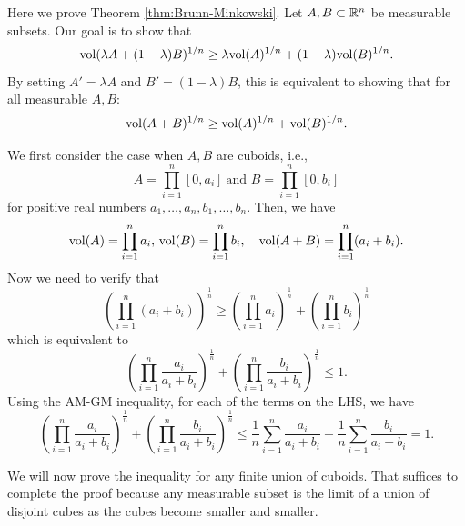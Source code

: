Here we prove Theorem \ref{thm:Brunn-Minkowski}. Let $A,B\subset\mathbb{R}^{n}$
be measurable subsets. Our goal is to show that 
\[
\mathrm{vol}(\lambda A+(1-\lambda)B)^{1/n}\ge\lambda\mathrm{vol}(A)^{1/n}+(1-\lambda)\mathrm{vol}(B)^{1/n}.
\]
By setting $A'=\lambda A$ and $B'=(1-\lambda)B$, this is equivalent
to showing that for all measurable $A,B$:
\begin{equation}
\mathrm{vol}(A+B)^{1/n}\ge\mathrm{vol}(A)^{1/n}+\mathrm{vol}(B)^{1/n}.\label{eq:BM-ineq}
\end{equation}

We first consider the case when $A,B$ are cuboids, i.e., 
\[
A=\prod^{n}_{i=1}[0,a_{i}]\ \mbox{and \ }B=\prod^{n}_{i=1}[0,b_{i}]
\]
for positive real numbers $a_{1},\ldots,a_{n},b_{1},\ldots,b_{n}$.
Then, we have 
\[
\mathrm{vol}(A)=\prod^{n}_{i=1}a_{i},\,\mathrm{vol}(B)=\prod^{n}_{i=1}b_{i},\quad\mathrm{vol}(A+B)=\prod^{n}_{i=1}(a_{i}+b_{i}).
\]
Now we need to verify that 
\[
\left(\prod^{n}_{i=1}(a_{i}+b_{i})\right)^{\frac{1}{n}}\ge\left(\prod^{n}_{i=1}a_{i}\right)^{\frac{1}{n}}+\left(\prod^{n}_{i=1}b_{i}\right)^{\frac{1}{n}}
\]
which is equivalent to 
\[
\left(\prod^{n}_{i=1}\frac{a_{i}}{a_{i}+b_{i}}\right)^{\frac{1}{n}}+\left(\prod^{n}_{i=1}\frac{b_{i}}{a_{i}+b_{i}}\right)^{\frac{1}{n}}\le1.
\]
Using the AM-GM inequality, for each of the terms on the LHS, we have
\[
\left(\prod^{n}_{i=1}\frac{a_{i}}{a_{i}+b_{i}}\right)^{\frac{1}{n}}+\left(\prod^{n}_{i=1}\frac{b_{i}}{a_{i}+b_{i}}\right)^{\frac{1}{n}}\le\frac{1}{n}\sum^{n}_{i=1}\frac{a_{i}}{a_{i}+b_{i}}+\frac{1}{n}\sum^{n}_{i=1}\frac{b_{i}}{a_{i}+b_{i}}=1.
\]

We will now prove the inequality for any finite union of cuboids.
That suffices to complete the proof because any measurable subset
is the limit of a union of disjoint cubes as the cubes become smaller
and smaller. 

